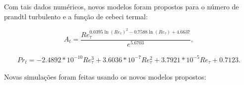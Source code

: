 Com tais dados numéricos, novos modelos foram propostos para o número de prandtl turbulento e a função de cebeci termal:

\begin{equation}
  A_t = \frac{Re_\tau ^{0.0395 \ln(Re_\tau)^2 - 0.7588 \ln(Re_\tau) +  4.6637  } }{e ^{5.6703}},
\end{equation}

\begin{equation}
  \begin{split}
    Pr_t = -2.4892 * 10^{-10} Re_\tau^3 +  3.6036 * 10^{-7} Re_\tau^2 + 3.7921 *10 ^{-5} Re_\tau + 0.7123 .
  \end{split}
\end{equation}

Novas simulações foram feitas usando os novos modelos propostos:

